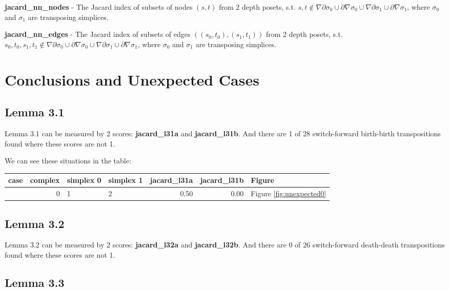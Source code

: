 \documentclass{article}
\begin{document}
\par \textbf{jacard\_nn\_nodes} -
The Jacard index of subsets of nodes $(s, t)$ from 2 depth posets, s.t.
$s, t \notin \nabla\partial\sigma_0 \cup \partial\nabla\sigma_0 \cup \nabla\partial\sigma_1 \cup \partial\nabla\sigma_1$,
where $\sigma_0$ and $\sigma_1$ are transposing simplices.


\par \textbf{jacard\_nn\_edges} -
The Jacard index of subsets of edges $((s_0, t_0), (s_1, t_1))$ from 2 depth posets, s.t.
$s_0, t_0, s_1, t_1 \notin \nabla\partial\sigma_0 \cup \partial\nabla\sigma_0 \cup \nabla\partial\sigma_1 \cup \partial\nabla\sigma_1$,
where $\sigma_0$ and $\sigma_1$ are transposing simplices.



\section{Conclusions and Unexpected Cases}
\subsection{Lemma 3.1}

\par Lemma 3.1 can be measured by 2 scores: \textbf{jacard\_l31a} and \textbf{jacard\_l31b}.
And there are 1 of 28 switch-forward birth-birth transpositions found where these scores are not 1.
\par We can see these situations in the table:
\begin{center}\begin{tabular}{lrllrrl}
\toprule
case & complex & simplex 0 & simplex 1 & jacard\_l31a & jacard\_l31b & Figure \\
\midrule
& 0 & 1 & 2 & 0.50 & 0.00 & Figure \ref{fig:unexpected0} \\
\bottomrule
\end{tabular}
\end{center}
\subsection{Lemma 3.2}

\par Lemma 3.2 can be measured by 2 scores: \textbf{jacard\_l32a} and \textbf{jacard\_l32b}.
And there are 0 of 26 switch-forward death-death transpositions found where these scores are not 1.

\subsection{Lemma 3.3}
\end{document}
